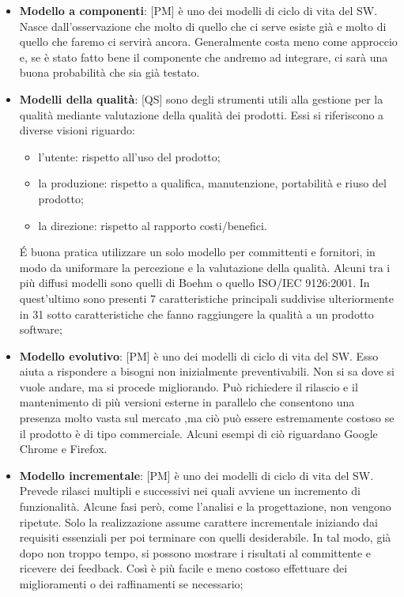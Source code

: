 \begin{itemize}
	\item \textbf{Modello a componenti}: [PM] è uno dei modelli di ciclo di vita del SW. Nasce dall'osservazione che molto di quello che ci serve esiste già e molto di quello che faremo ci servirà ancora. \newline
Generalmente costa meno come approccio e, se è stato fatto bene il componente che andremo ad integrare, ci sarà una buona probabilità che sia già testato.

	\item \textbf{Modelli della qualità}: [QS] sono degli strumenti utili alla gestione per la qualità mediante valutazione della qualità dei prodotti. Essi si riferiscono a diverse visioni riguardo:
		\begin{itemize}
			\item l'utente: rispetto all'uso del prodotto;
			\item la produzione: rispetto a qualifica, manutenzione, portabilità e riuso del prodotto;
			\item la direzione: rispetto al rapporto costi/benefici.
		\end{itemize}
		\noindent
		\'E buona pratica utilizzare un solo modello per committenti e fornitori, in modo da uniformare la percezione e la valutazione della qualità. Alcuni tra i più diffusi modelli sono quelli di Boehm o quello ISO/IEC 9126:2001. In quest'ultimo sono presenti 7 caratteristiche principali suddivise ulteriormente in 31 sotto caratteristiche che fanno raggiungere la qualità a un prodotto software;

	\item \textbf{Modello evolutivo}: [PM] è uno dei modelli di ciclo di vita del SW. Esso aiuta a rispondere a bisogni non inizialmente preventivabili. Non si sa dove si vuole andare, ma si procede migliorando. \newline
Può richiedere il rilascio e il mantenimento di più versioni esterne in parallelo che consentono una presenza molto vasta sul mercato ,ma ciò può essere estremamente costoso se il prodotto è di tipo commerciale. Alcuni esempi di ciò riguardano Google Chrome e Firefox.

	\item \textbf{Modello incrementale}: [PM] è uno dei modelli di ciclo di vita del SW. Prevede rilasci multipli e successivi nei quali avviene un incremento di funzionalità. \newline
Alcune fasi però, come l'analisi e la progettazione, non vengono ripetute. Solo la realizzazione assume carattere incrementale iniziando dai requisiti essenziali per poi terminare con quelli desiderabile. In tal modo, già dopo non troppo tempo, si possono mostrare i risultati al committente e ricevere dei feedback. \newline
Così è più facile e meno costoso effettuare dei miglioramenti o dei raffinamenti se necessario;


\end{itemize}
